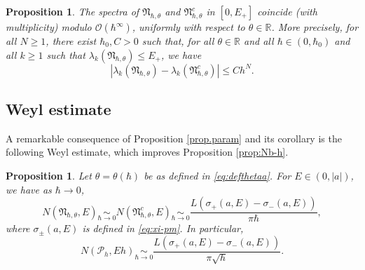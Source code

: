 \documentclass[10pt]{amsart}
\newcommand{\cP}{\mathcal{P}}
\theoremstyle{plain}
\newtheorem{proposition}[theorem]{Proposition}
\theoremstyle{definition}
\begin{document}
\begin{proposition}\label{prop.coincide}
The spectra of $\mathfrak{N}_{\hbar,\theta}$ and $\mathfrak{N}^c_{\hbar,\theta}$ in $[0,E_+]$ coincide (with multiplicity) modulo $\mathscr{O}(\hbar^\infty)$, uniformly with respect to $\theta\in\mathbb{R}$. More precisely, for all $N\geq 1$, there exist $\hbar_0, C>0$ such that, for all $\theta\in\mathbb{R}$ and all $\hbar\in(0,\hbar_0)$ and all $k\geq 1$ such that $\lambda_k(\mathfrak{N}_{\hbar,\theta})\leq E_+$, we have
\[
|\lambda_k(\mathfrak{N}_{\hbar,\theta})-\lambda_k(\mathfrak{N}^c_{\hbar,\theta})|\leq Ch^N.
\]
\end{proposition}

\subsection{Weyl estimate}
A remarkable consequence of Proposition \ref{prop.param} and its corollary is the following Weyl estimate, which improves Proposition \ref{prop:Nb-h}.
\begin{proposition}\label{cor.Weyl}
Let $\theta=\theta(\hbar)$ be as defined in \eqref{eq:defthetaa}. For $E\in(0,|a|)$, we have as $\hbar\to0$,
\[
N(\mathfrak{N}_{\hbar,\theta},E)\underset{\hbar\to 0}\sim N(\mathfrak{N}^c_{\hbar,\theta},E)\underset{\hbar\to 0}\sim \frac{L(\sigma_+(a,E)-\sigma_-(a,E))}{\pi\hbar},
\]
where $\sigma_\pm(a,E)$ is defined in \eqref{eq:xi-pm}.
In particular,
\[
N(\cP_h, Eh)\underset{\hbar\to 0}\sim \frac{L(\sigma_+(a,E)-\sigma_-(a,E))}{\pi\sqrt{h}}.
\]
\end{proposition}
\end{document}
